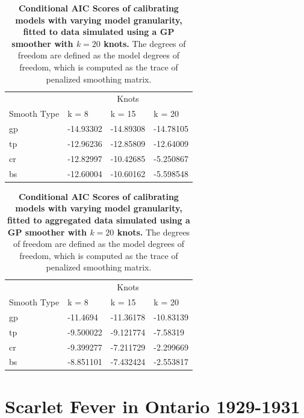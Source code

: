 \documentclass[
11pt, %
oneside, %
english, %
singlespacing, %
]{macthesis} %
\begin{document}
\begin{table}[!h]
\centering
\caption{\label{tab:aic-table-sim}\textbf{Conditional AIC Scores of calibrating models with varying model granularity, fitted to data simulated using a GP smoother with \(k=20\) knots.} The degrees of freedom are defined as the model degrees of freedom, which is computed as the trace of penalized smoothing matrix.}
\centering
\begin{tabular}[t]{llll}
\toprule
\multicolumn{1}{c}{ } & \multicolumn{3}{c}{Knots} \\
\cmidrule(l{3pt}r{3pt}){2-4}
Smooth Type & k = 8 & k = 15 & k = 20\\
\midrule
gp & -14.93302 & -14.89308 & -14.78105\\
tp & -12.96236 & -12.85809 & -12.64009\\
cr & -12.82997 & -10.42685 & -5.250867\\
bs & -12.60004 & -10.60162 & -5.598548\\
\bottomrule
\end{tabular}
\end{table}

\begin{table}[!h]
\centering
\caption{\label{tab:aic-table-sim-agg}\textbf{Conditional AIC Scores of calibrating models with varying model granularity, fitted to aggregated data simulated using a GP smoother with \(k=20\) knots.} The degrees of freedom are defined as the model degrees of freedom, which is computed as the trace of penalized smoothing matrix.}
\centering
\begin{tabular}[t]{llll}
\toprule
\multicolumn{1}{c}{ } & \multicolumn{3}{c}{Knots} \\
\cmidrule(l{3pt}r{3pt}){2-4}
Smooth Type & k = 8 & k = 15 & k = 20\\
\midrule
gp & -11.4694 & -11.36178 & -10.83139\\
tp & -9.500022 & -9.121774 & -7.58319\\
cr & -9.399277 & -7.211729 & -2.299669\\
bs & -8.851101 & -7.432424 & -2.553817\\
\bottomrule
\end{tabular}
\end{table}

\section{Scarlet Fever in Ontario 1929-1931}\label{scarlet}
\end{document}
